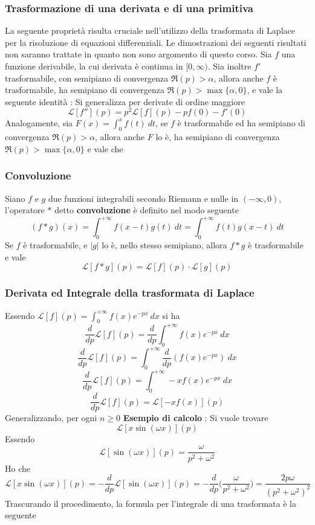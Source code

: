 \documentclass[10pt, letterpaper]{report}
\begin{document}
\subsubsection{Trasformazione di una derivata e di una primitiva}
La seguente proprietà risulta cruciale nell'utilizzo della trasformata di Laplace per la risoluzione di 
equazioni differenziali. Le dimostrazioni dei seguenti risultati non saranno trattate in quanto non 
sono argomento di questo corso.\acc 
Sia $f$ una funzione derivabile, la cui derivata è continua in $[0,\infty)$. Sia inoltre $f'$ trasformabile, con 
semipiano di convergenza $\Re(p)>\alpha$, allora anche $f$ è trasformabile, ha semipiano di 
convergenza $\Re(p)>\max\{\alpha,0\}$, e vale la seguente identità :
Si generalizza per derivate di ordine maggiore 
$$ 
\mathcal{L}[f''](p)=p^2\mathcal{L}[f](p)-pf(0)-f'(0)
$$
Analogamente, sia $F(x)=\int_0^x f(t)\ dt$, se $f$ è trasformabile ed ha semipiano di convergenza  $\Re(p)>\alpha$, 
allora anche $F$ lo è, ha semipiano di convergenza $\Re(p)>\max\{\alpha,0\}$ e vale che 
\subsubsection{Convoluzione}
Siano $f$ e $g$ due funzioni integrabili secondo Riemann e nulle in $(-\infty,0)$, l'operatore $*$ detto \textbf{convoluzione} è 
definito nel modo seguente 
$$ (f*g)(x)=\int_0^{+\infty}f(x-t)g(t)\ dt=\int_0^{+\infty}f(t)g(x-t)\ dt$$
Se $f$ è trasformabile, e $|g|$ lo è, nello stesso semipiano, allora $f*g$ è trasformabile e vale 
$$ \mathcal{L}[f*g](p)=\mathcal{L}[f](p)\cdot\mathcal{L}[g](p)$$
\subsubsection{Derivata ed Integrale della trasformata di Laplace}
Essendo $\mathcal{L}[f](p)=\int_0^{+\infty}f(x)e^{-px}\ dx$
si ha 
 $$\frac{d}{dp}\mathcal{L}[f](p)=\frac{d}{dp}\int_0^{+\infty}f(x)e^{-px}\ dx$$
  $$\frac{d}{dp}\mathcal{L}[f](p)=\int_0^{+\infty}\frac{d}{dp}(f(x)e^{-px})\ dx$$
   $$\frac{d}{dp}\mathcal{L}[f](p)=\int_0^{+\infty}-xf(x)e^{-px}\ dx$$
    $$\frac{d}{dp}\mathcal{L}[f](p)=\mathcal{L}[-xf(x)](p)$$
    Generalizzando, per ogni $n\ge 0$ 
\textbf{Esempio di calcolo} : Si vuole trovare  
$$ \mathcal{L}[x\sin(\omega x)](p)$$
Essendo 
$$  \mathcal{L}[\sin(\omega x)](p) = \frac{\omega}{p^2+\omega^2}$$
Ho che 
$$\mathcal{L}[x\sin(\omega x)](p) = - \frac{d}{dp}\mathcal{L}[\sin(\omega x)](p) = 
- \frac{d}{dp}\Big(\frac{\omega}{p^2+\omega^2}\Big)=\frac{2p\omega}{(p^2+\omega^2)^2}$$
Trascurando il procedimento, la formula per l'integrale di una trasformata è la seguente 
\end{document}
